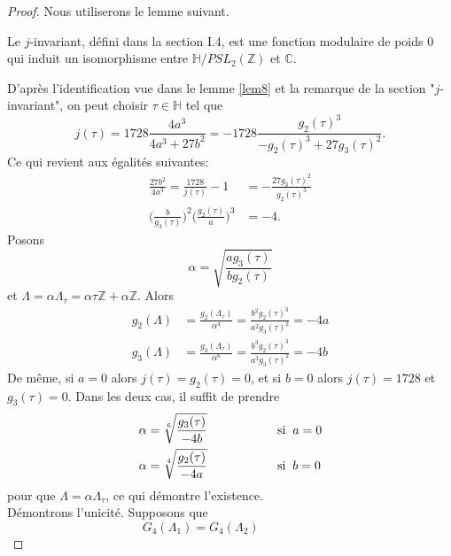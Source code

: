 \documentclass[a4paper]{article}
\begin{document}
\begin{proof}
Nous utiliserons le lemme suivant.
\begin{lem}[admis]\label{lem8}
Le $j$-invariant, défini dans la section I.4, est une fonction modulaire de poids 0
qui induit un isomorphisme entre $\mathbb{H}/PSL_{2}(\mathbb{Z})$ et $\mathbb{C}$.
\end{lem}

\noindent D'après l'identification vue dans le lemme \ref{lem8} et la remarque de la section "$j$-invariant", on peut choisir  $\tau \in \mathbb{H}$ tel que 
\begin{equation*}
j(\tau)=1728 \frac{4a^3}{4a^3+27b^2}=-1728 \frac{g_{2}(\tau)^3}{-g_{2}(\tau)^3+27g_{3}(\tau)^2}.
\end{equation*}
Ce qui revient aux égalités suivantes:
\begin{align*}
\frac{27b^2}{4a^3}=\frac{1728}{j(\tau)}-1&=-\frac{27g_{3}(\tau)^2}{g_{2}(\tau)^3} \\
\Bigg(\frac{b}{g_{3}(\tau)}\Bigg)^2 \Bigg(\frac{g_{2}(\tau)}{a}\Bigg)^3 &=-4.
\end{align*}
Posons 
\begin{equation*}
\alpha=\sqrt{\frac{ag_{3}(\tau)}{bg_{2}(\tau)}}
\end{equation*}
et $\Lambda=\alpha \Lambda_{\tau}= \alpha\tau\mathbb{Z}+\alpha\mathbb{Z}$.
Alors
\begin{align*}
g_{2}(\Lambda)&=\frac{g_{2}(\Lambda_{\tau})}{\alpha^4}=\frac{b^2g_{2}(\tau)^3}{a^2g_{3}(\tau)^2}=-4a
\\
g_{3}(\Lambda)&=\frac{g_{3}(\Lambda_{\tau})}{\alpha^6}=\frac{b^3g_{2}(\tau)^3}{a^3g_{3}(\tau)^2}=-4b
\end{align*}
De même, si $a=0$ alors $j(\tau)=g_{2}(\tau)=0$, et si $b=0$ alors $j(\tau)=1728$ et $g_{3}(\tau)=0$.
Dans les deux cas, il suffit de prendre
\begin{align*}
\alpha &=\sqrt[6]{\frac{g_{3}(\tau)}{-4b}} \hspace{2cm} \text{si} \hspace{0.2 cm} a=0 \\
\alpha &=\sqrt[4]{\frac{g_{2}(\tau)}{-4a}} \hspace{2cm} \text{si} \hspace{0.2 cm} b=0
\end{align*}
pour que $\Lambda=\alpha\Lambda_{\tau}$, ce qui démontre l'existence. \\
Démontrons l'unicité.
Supposons que 
\begin{equation*}
G_{4}(\Lambda_{1})=G_{4}(\Lambda_{2}) \hspace{2cm}

\end{equation*}
\end{proof}
\end{document}
